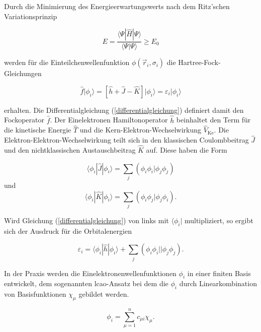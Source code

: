 Durch die Minimierung des Energieerwartungswerts nach dem Ritz'schen Va\-ria\-ti\-ons\-prin\-zip\supercite{macdonald1933successive}

\begin{equation}
E=\frac{\langle\Psi|\hat{H}|\Psi\rangle}{\langle\Psi|\Psi\rangle}\geq E_0
\end{equation}

werden für die Einteilchenwellenfunktion $\phi(\vec{r}_i,\sigma_i)$ die Hartree-Fock-Gleichungen

\begin{equation}
\hat{f}\vert\phi_i\rangle=\left[\hat{h}+\hat{J}-\hat{K}\right]\vert\phi_i\rangle=\varepsilon_i\vert\phi_i\rangle
\label{differentialgleichung}
\end{equation}

erhalten. Die Differentialgleichung (\ref{differentialgleichung}) definiert damit den Fockoperator $\hat{f}$. Der Einelektronen Hamiltonoperator $\hat{h}$ beinhaltet den Term für die kinetische Energie $\hat{T}$ und die Kern-Elektron-Wechselwirkung $\hat{V}_{\text{Ke}}$. Die Elektron-Elektron-Wechselwirkung teilt sich in den klassischen Coulombbeitrag $\hat{J}$ und den nichtklassischen Austauschbeitrag $\hat{K}$ auf. Diese haben die Form

\begin{equation}
\langle\phi_i|\hat{J}|\phi_i\rangle=\sum_j\left(\phi_i\phi_i|\phi_j\phi_j\right)
\end{equation}
und 
\begin{equation}
\langle\phi_i|\hat{K}|\phi_i\rangle=\sum_j\left(\phi_i\phi_j|\phi_j\phi_i\right).
\end{equation}

Wird Gleichung (\ref{differentialgleichung}) von links mit $\langle\phi_i\vert$ multipliziert, so ergibt sich der Ausdruck für die Orbitalenergien

\begin{equation}
\varepsilon_i = \langle\phi_i|\hat{h}|\phi_i\rangle + \sum_j\left(\phi_i\phi_i||\phi_j\phi_j\right).
\label{orbitalenergie}
\end{equation}

In der Praxis werden die Einelektronenwellenfunktionen $\phi_i$ in einer finiten Basis entwickelt, dem sogenannten \ac{lcao}-Ansatz bei dem die $\phi_i$ durch Linearkombination von Basisfunktionen $\chi_\mu$ gebildet werden. 

\begin{equation}
\phi_i=\sum_{\mu=1}^nc_{\mu i}\chi_{\mu}.
\end{equation}

